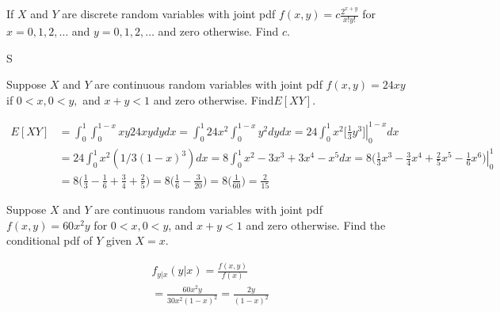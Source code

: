 \documentclass[answers]{exam}
\begin{document}
\begin{questions}
\question 
If $X$ and $Y$ are discrete random variables with joint pdf \(f(x,y) = c\frac{2^{x+y}}{x!y!}\) 
for \(x=0,1,2,\ldots\) and \(y=0,1,2,\ldots\) and zero otherwise. Find $c$.
\begin{solution}
	S
\end{solution}

\question 
Suppose $X$ and $Y$ are continuous random variables with joint pdf
\(f(x,y)= 24xy\) if \(0<x,0<y,\) and \(x+y<1\) and zero otherwise. Find\(E[XY]\).
\begin{solution}
	\begin{align*}
		E[XY]
		&= \int_{0}^{1}\int_{0}^{1-x} xy 24 xy dy dx
		= \int_{0}^{1} 24x^2 \int_{0}^{1-x} y^2 dy dx
		= 24 \int_{0}^{1} x^2 \bigg[\left. \frac{1}{3}y^3 \bigg]\right|_{0}^{1-x} dx
		\\&= 24 \int_{0}^{1} x^2 (1/3(1-x)^3) dx
		= 8 \int_{0}^{1} x^2-3x^3+3x^4-x^5  dx
		= 8 \left. \bigg(\frac{1}{3}x^3-\frac{3}{4}x^4+\frac{2}{5}x^5-\frac{1}{6}x^6\bigg) \right|_{0}^{1}
		\\&= 8\bigg(\frac{1}{3}-\frac{1}{6}+\frac{3}{4}+\frac{2}{5}\bigg)
		= 8\bigg(\frac{1}{6}-\frac{3}{20}\bigg)
		= 8\bigg(\frac{1}{60}\bigg)
		= \frac{2}{15}
	\end{align*}
\end{solution}

\question 
Suppose $X$ and $Y$ are continuous random variables with joint pdf
\(f(x,y) = 60x^2y\) for \(0<x,0<y\), and \(x+y<1\) and zero otherwise. Find the
conditional pdf of $Y$ given \(X=x\).
\begin{solution}
	\begin{align*}
		&f_{y|x}(y|x) 
		= \frac{f(x,y)}{f(x)} 
		\\&= \frac{60x^2y}{30x^2(1-x)^2}
		= \frac{2y}{(1-x)^2}
	\end{align*}
\end{solution}

\end{questions}
\end{document}
